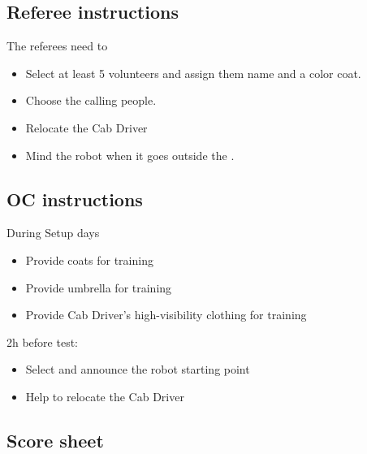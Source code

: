 \subsection*{Referee instructions}

The referees need to
\begin{itemize}
	\item Select at least 5 volunteers and assign them name and a color coat.
	\item Choose the calling people.
	\item Relocate the Cab Driver
	\item Mind the robot when it goes outside the \Arena{}.
\end{itemize}

\subsection*{OC instructions}
During Setup days
\begin{itemize}
	\item Provide coats for training
	\item Provide umbrella for training
	\item Provide Cab Driver's high-visibility clothing for training
\end{itemize}

2h before test:
\begin{itemize}
	\item Select and announce the robot starting point
	\item Help to relocate the Cab Driver
\end{itemize}

\subsection*{Score sheet}

